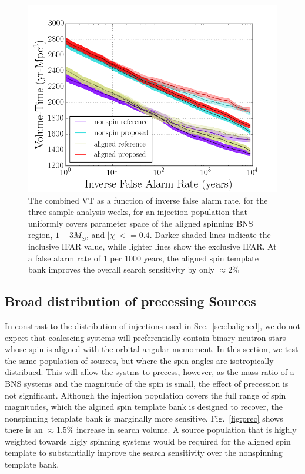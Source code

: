 \begin{figure}
\centering
\includegraphics[width=1.0\textwidth]{papers/bns_o1_dev/figures/aligned_combined.png}
\caption{\label{fig:aligned} 
The combined VT as a function of inverse false alarm rate, for the
three sample analysis weeks, for an injection population that uniformly covers parameter space of the aligned spinning BNS region, $1- 3M_\odot$, and $|\chi| <= 0.4$. Darker shaded lines indicate the inclusive IFAR value, while lighter lines show the exclusive IFAR. At a false alarm rate of 1 per 1000 years, the aligned spin template bank improves the overall search sensitivity by only $\approx 2\%$
}
\end{figure}

\subsection{Broad distribution of precessing Sources}

In constrast to the distribution of injections used in Sec.~\ref{sec:baligned}, we do not expect that coalescing systems will preferentially contain binary neutron stars whose spin is aligned with the orbital angular memoment. In this section, we test the same population of sources, but where the spin angles are isotropically distribued. This will allow the systms to precess, however, as the mass ratio of a BNS systems and the magnitude of the spin is small, the effect of precession is not significant. Although the injection population covers the full range of spin magnitudes, which the algined spin template bank is designed to recover, the nonspinning template bank is marginally more sensitive. Fig.~\ref{fig:prec} shows there is an $\approx 1.5\%$ increase in search volume. A source population that is highly weighted towards higly spinning systems would be required for the aligned spin template to substantially improve the search sensitivity over the nonspinning template bank. 

